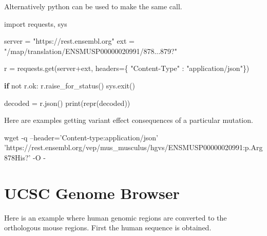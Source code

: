 \documentclass[]{book}
\newenvironment{Shaded}{\begin{snugshade}}{\end{snugshade}}
\newcommand{\KeywordTok}[1]{\textcolor[rgb]{0.13,0.29,0.53}{\textbf{#1}}}
\newcommand{\StringTok}[1]{\textcolor[rgb]{0.31,0.60,0.02}{#1}}
\newcommand{\FunctionTok}[1]{\textcolor[rgb]{0.00,0.00,0.00}{#1}}
\newcommand{\OperatorTok}[1]{\textcolor[rgb]{0.81,0.36,0.00}{\textbf{#1}}}
\newcommand{\ExtensionTok}[1]{#1}
\newcommand{\NormalTok}[1]{#1}
\begin{document}
Alternatively python can be used to make the same call.

\begin{Shaded}
\begin{Highlighting}[]
\ExtensionTok{import}\NormalTok{ requests, sys}
 
\ExtensionTok{server}\NormalTok{ = }\StringTok{"https://rest.ensembl.org"}
\ExtensionTok{ext}\NormalTok{ = }\StringTok{"/map/translation/ENSMUSP00000020991/878...879?"}
 
\ExtensionTok{r}\NormalTok{ = requests.get(server+ext, headers=\{ }\StringTok{"Content-Type"}\NormalTok{ : }\StringTok{"application/json"}\NormalTok{\})}
 
\KeywordTok{if} \ExtensionTok{not}\NormalTok{ r.ok:}
  \ExtensionTok{r.raise_for_status}\NormalTok{()}
  \ExtensionTok{sys.exit}\NormalTok{()}
 
\ExtensionTok{decoded}\NormalTok{ = r.json()}
\ExtensionTok{print}\NormalTok{(repr(decoded))}
\end{Highlighting}
\end{Shaded}

Here are examples getting variant effect consequences of a particular
mutation.

\begin{Shaded}
\begin{Highlighting}[]
\FunctionTok{wget}\NormalTok{ -q --header=}\StringTok{'Content-type:application/json'} \StringTok{'https://rest.ensembl.org/vep/mus_musculus/hgvs/ENSMUSP00000020991:p.Arg878His?'}\NormalTok{  -O -}
\end{Highlighting}
\end{Shaded}

\section{UCSC Genome Browser}\label{ucsc-genome-browser-1}

Here is an example where human genomic regions are converted to the
orthologous mouse regions. First the human sequence is obtained.

\begin{Shaded}
\end{Shaded}
\end{document}
